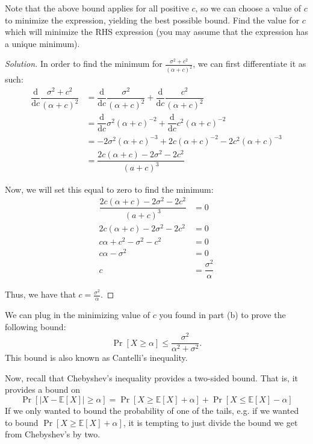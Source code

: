 \documentclass{article}
\newenvironment{solution}{\begin{proof}[Solution]}{\end{proof}}
\newcommand{\E}{\mathbb{E}}
\begin{document}
\begin{hw}
	Note that the above bound applies for all positive $c$, so we can choose a value of $c$ to minimize the expression, yielding the best possible bound. 
	Find the value for $c$ which will minimize the RHS expression (you may assume that the expression has a unique minimum).
\end{hw}
\begin{solution}
	In order to find the minimum for $\frac{\sigma^{2} + c^{2}}{(\alpha + c)^{2}}$, we can first differentiate it as such:
	\begin{align*}
		\dfrac{\mathrm{d}}{\mathrm{d}c} \dfrac{\sigma^{2} + c^{2}}{(\alpha + c)^{2}} &= \dfrac{\mathrm{d}}{\mathrm{d}c} \dfrac{\sigma^{2}}{(\alpha + c)^{2}} + \dfrac{\mathrm{d}}{\mathrm{d}c} \dfrac{c^{2}}{(\alpha + c)^{2}} \\
		&= \dfrac{\mathrm{d}}{\mathrm{d}c} \sigma^{2}(\alpha + c)^{-2} + \dfrac{\mathrm{d}}{\mathrm{d}c} c^{2}(\alpha + c)^{-2} \\
		&= -2\sigma^{2}(\alpha + c)^{-3} + 2c(\alpha + c)^{-2} - 2c^{2}(\alpha + c)^{-3} \\
		&= \dfrac{2c(\alpha + c) - 2\sigma^{2} - 2c^{2}}{(a+c)^{3}}
	\end{align*}

	Now, we will set this equal to zero to find the minimum:
	\begin{align*}
		\dfrac{2c(\alpha + c) - 2\sigma^{2} - 2c^{2}}{(a+c)^{3}} &= 0 \\
		2c(\alpha + c) - 2\sigma^{2} - 2c^{2} &= 0 \\
		c\alpha + c^{2} - \sigma^{2} - c^{2} &= 0 \\
		c\alpha - \sigma^{2} &= 0 \\
		c &= \dfrac{\sigma^{2}}{\alpha}
	\end{align*}

	Thus, we have that $c = \frac{\sigma^{2}}{\alpha}$.
\end{solution}

We can plug in the minimizing value of $c$ you found in part (b) to prove the following bound:
\[\Pr\left[X \geq \alpha\right] \leq \frac{\sigma^2}{\alpha^2 + \sigma^2}.\]
This bound is also known as Cantelli's inequality.

Now, recall that Chebyshev's inequality provides a two-sided bound.
That is, it provides a bound on \[\Pr\left[|X-\E[X]| \ge \alpha\right] = \Pr\left[X \ge \E[X] + \alpha\right] + \Pr\left[X \le \E[X] - \alpha\right]\]
If we only wanted to bound the probability of one of the tails, e.g. if we wanted to bound $\Pr\left[X \ge \E[X] + \alpha\right]$, it is tempting to just divide the bound we get from Chebyshev's by two.
\end{document}
